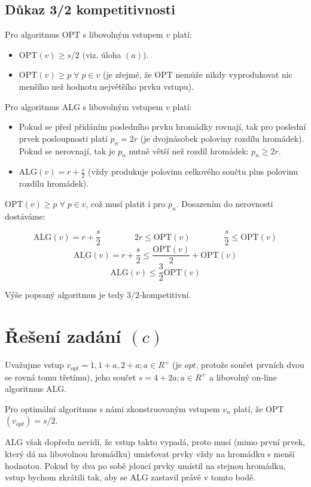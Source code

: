 \documentclass[a4paper, 12pt]{article}
\begin{document}
  \subsection{Důkaz 3/2 kompetitivnosti}
  Pro algoritmus OPT s libovolným vstupem $v$ platí:
  \begin{itemize}
    \item OPT$(v) \ge s/2$ (viz. úloha $(a)$).
    \item OPT$(v) \ge p \; \forall \; p \in v$ (je zřejmé, že OPT nemůže nikdy vyprodukovat nic menšího než hodnotu největšího prvku vstupu).
  \end{itemize}

  Pro algoritmus ALG s libovolným vstupem $v$ platí:
  \begin{itemize}
    \item Pokud se před přidáním posledního prvku hromádky rovnají, tak pro poslední prvek posloupnosti platí $p_n=2r$ (je dvojnásobek poloviny rozdílu hromádek). Pokud se nerovnají, tak je $p_n$ nutně větší než rozdíl hromádek: $p_n \ge 2r$.
    \item ALG$(v)=r+\frac{s}{2}$ (vždy produkuje polovinu celkového součtu plus polovinu rozdílu hromádek).
  \end{itemize}

  OPT$(v) \ge p \; \forall \; p \in v$, což musí platit i pro $p_n$. Dosazením do nerovnosti dostáváme:

  $$\text{ALG}(v)=r+\frac{s}{2} \qquad \qquad 2r \le \text{OPT}(v) \qquad \qquad \frac{s}{2} \le \text{OPT}(v)$$
  $$\text{ALG}(v)=r+\frac{s}{2} \le \frac{\text{OPT}(v)}{2}+\text{OPT}(v)$$
  $$\text{ALG}(v) \le \frac{3}{2}\text{OPT}(v)$$

  Výše popsaný algoritmus je tedy $3/2$-kompetitivní.

  \section{Řešení zadání $(c)$}
  Uvažujme vstup $v_{opt}=1,1+a,2+a; a \in R^+$ (je $opt$, protože součet prvních dvou se rovná tomu třetímu), jeho součet $s=4+2a; a \in R^+$ a libovolný on-line algoritmus ALG.

  Pro optimální algoritmus s námi zkonstruovaným vstupem $v_n$ platí, že OPT$(v_{opt})=s/2$.

  ALG však dopředu nevidí, že vstup takto vypadá, proto musí (mimo první prvek, který dá na libovolnou hromádku) umisťovat prvky vždy na hromádku s menší hodnotou. Pokud by dva po sobě jdoucí prvky umístil na stejnou hromádku, vstup bychom zkrátili tak, aby se ALG zastavil právě v tomto bodě.
\end{document}
